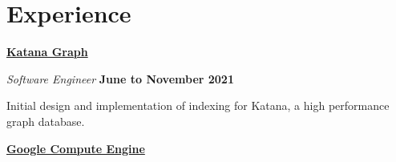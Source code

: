\section{Experience}
\href{https://katanagraph.ai}{\textbf{Katana Graph}}
\begin{outerlist}
\item[] \textit{Software Engineer}%
   \hfill \textbf{June to November 2021}
   \begin{outerlist}
      \item Initial design and implementation of indexing for Katana, a high
      performance graph database.
   \end{outerlist}
\end{outerlist}

\bigskip

\href{https://cloud.google.com/compute}{\textbf{Google Compute Engine}}
